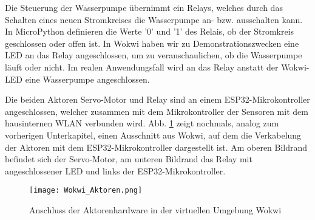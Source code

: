 Die Steuerung der Wasserpumpe übernimmt ein Relays, welches durch das Schalten eines neuen Stromkreises die Wasserpumpe an- bzw. ausschalten kann. In MicroPython definieren die Werte '0' und '1' des Relais, ob der Stromkreis geschlossen oder offen ist. In Wokwi haben wir zu Demonstrationszwecken eine LED an das Relay angeschlossen, um zu veranschaulichen, ob die Wasserpumpe läuft oder nicht. Im realen Anwendungsfall wird an das Relay anstatt der Wokwi-LED eine Wasserpumpe angeschlossen.

Die beiden Aktoren Servo-Motor und Relay sind an einem ESP32-Mikrokontroller angeschlossen, welcher zusammen mit dem Mikrokontroller der Sensoren mit dem hausinternen WLAN verbunden wird. Abb. \ref{fig:wokwi_aktoren} zeigt nochmals, analog zum vorherigen Unterkapitel, einen Ausschnitt aus Wokwi, auf dem die Verkabelung der Aktoren mit dem ESP32-Mikrokontroller dargestellt ist. Am oberen Bildrand befindet sich der Servo-Motor, am unteren Bildrand das Relay mit angeschlossener LED und links der ESP32-Mikrokontroller.

\begin{figure}[h]
    \centering
    \texttt{[image: Wokwi\_Aktoren.png]}
    \caption{Anschluss der Aktorenhardware in der virtuellen Umgebung Wokwi}\label{fig:wokwi_aktoren}
\end{figure}